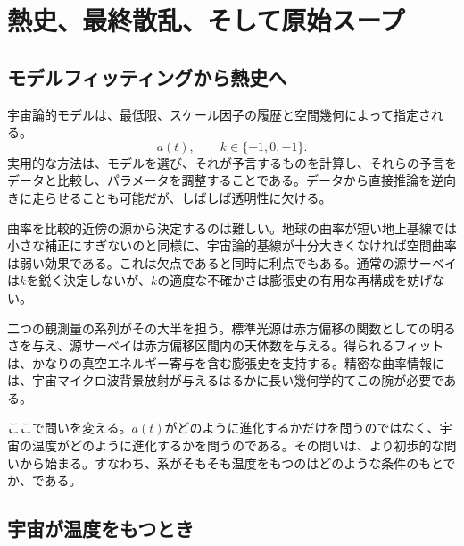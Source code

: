 \chapter{熱史、最終散乱、そして原始スープ}


\section{モデルフィッティングから熱史へ}

宇宙論的モデルは、最低限、スケール因子の履歴と空間幾何によって指定される。
\begin{equation}
a(t),
\qquad
k\in\{+1,0,-1\}.
\end{equation}
実用的な方法は、モデルを選び、それが予言するものを計算し、それらの予言をデータと比較し、パラメータを調整することである。データから直接推論を逆向きに走らせることも可能だが、しばしば透明性に欠ける。

曲率を比較的近傍の源から決定するのは難しい。地球の曲率が短い地上基線では小さな補正にすぎないのと同様に、宇宙論的基線が十分大きくなければ空間曲率は弱い効果である。これは欠点であると同時に利点でもある。通常の源サーベイは\(k\)を鋭く決定しないが、\(k\)の適度な不確かさは膨張史の有用な再構成を妨げない。

二つの観測量の系列がその大半を担う。標準光源は赤方偏移の関数としての明るさを与え、源サーベイは赤方偏移区間内の天体数を与える。得られるフィットは、かなりの真空エネルギー寄与を含む膨張史を支持する。精密な曲率情報には、宇宙マイクロ波背景放射が与えるはるかに長い幾何学的てこの腕が必要である。

ここで問いを変える。\(a(t)\)がどのように進化するかだけを問うのではなく、宇宙の温度がどのように進化するかを問うのである。その問いは、より初歩的な問いから始まる。すなわち、系がそもそも温度をもつのはどのような条件のもとでか、である。

\section{宇宙が温度をもつとき}

